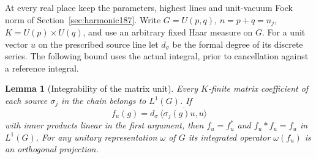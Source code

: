 \documentclass[a4paper,11pt]{article}
\newtheorem{lemma}[proposition]{Lemma}
\theoremstyle{definition}
\theoremstyle{remark}
\numberwithin{equation}{section}
\begin{document}
At every real place keep the parameters, highest lines and
unit-vacuum Fock norm of Section~\ref{sec:harmonic187}.
Write \(G=U(p,q)\), \(n=p+q=n_j\), \(K=U(p)\times U(q)\),
and use an arbitrary fixed Haar measure on \(G\). For a unit
vector \(u\) on the prescribed source line let \(d_\sigma\)
be the formal degree of its discrete series. The following
bound uses the actual integral, prior to cancellation against
a reference integral.

\begin{lemma}[Integrability of the matrix unit]
\label{lem:atom189}
Every \(K\)-finite matrix coefficient of each source
\(\sigma_j\) in the chain belongs to \(L^1(G)\). If
\[
       f_u(g)=d_\sigma\,\overline{\langle\sigma_j(g)u,u\rangle}
\]
with inner products linear in the first argument, then
\(f_u=f_u^*\) and \(f_u*f_u=f_u\) in \(L^1(G)\).
For any unitary representation \(\omega\) of \(G\) its
integrated operator \(\omega(f_u)\) is an orthogonal
projection.
\end{lemma}
\end{document}
